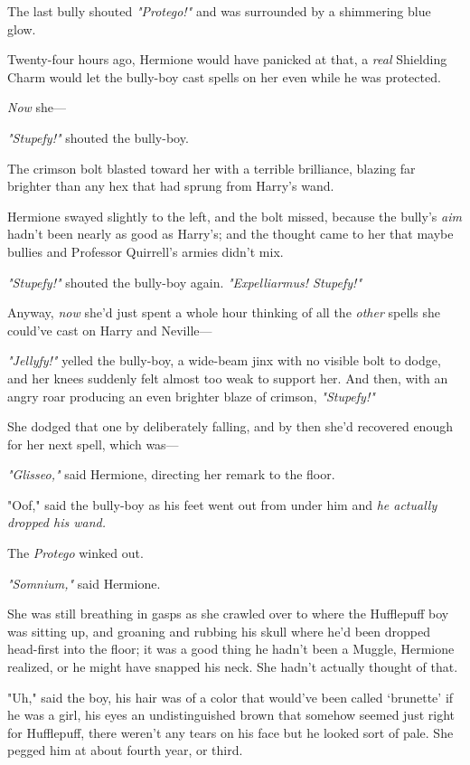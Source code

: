 The last bully shouted \emph{"Protego!"} and was surrounded by a shimmering
blue glow.

Twenty-four hours ago, Hermione would have panicked at that, a \emph{real}
Shielding Charm would let the bully-boy cast spells on her even while he was
protected.

\emph{Now} she\mbox{---}

\emph{"Stupefy!"} shouted the bully-boy.

The crimson bolt blasted toward her with a terrible brilliance, blazing far
brighter than any hex that had sprung from Harry's wand.

Hermione swayed slightly to the left, and the bolt missed, because the bully's
\emph{aim} hadn't been nearly as good as Harry's; and the thought came to her
that maybe bullies and Professor Quirrell's armies didn't mix.

\emph{"Stupefy!"} shouted the bully-boy again. \emph{"Expelliarmus! Stupefy!"}

Anyway, \emph{now} she'd just spent a whole hour thinking of all the
\emph{other} spells she could've cast on Harry and Neville\mbox{---}

\emph{"Jellyfy!"} yelled the bully-boy, a wide-beam jinx with no visible bolt
to dodge, and her knees suddenly felt almost too weak to support her. And then,
with an angry roar producing an even brighter blaze of crimson,
\emph{"Stupefy!"}

She dodged that one by deliberately falling, and by then she'd recovered enough
for her next spell, which was\mbox{---}

\emph{"Glisseo,"} said Hermione, directing her remark to the floor.

"Oof," said the bully-boy as his feet went out from under him and \emph{he
actually dropped his wand.}

The \emph{Protego} winked out.

\emph{"Somnium,"} said Hermione.

She was still breathing in gasps as she crawled over to where the Hufflepuff
boy was sitting up, and groaning and rubbing his skull where he'd been dropped
head-first into the floor; it was a good thing he hadn't been a Muggle,
Hermione realized, or he might have snapped his neck. She hadn't actually
thought of that.

"Uh," said the boy, his hair was of a color that would've been called
`brunette' if he was a girl, his eyes an undistinguished brown that somehow
seemed just right for Hufflepuff, there weren't any tears on his face but he
looked sort of pale. She pegged him at about fourth year, or third.

